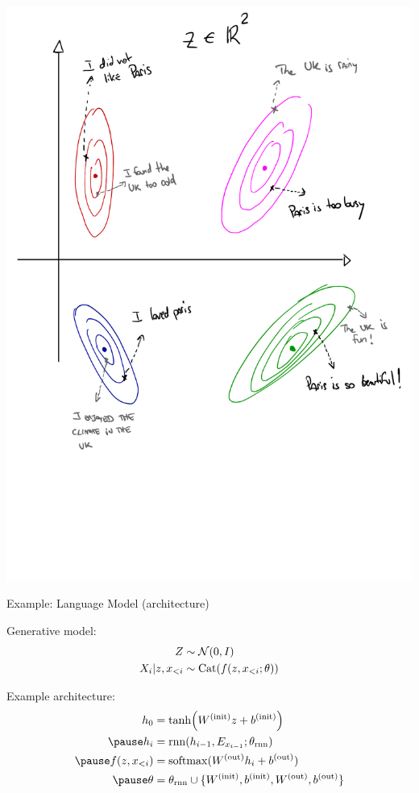 \documentclass[14pt]{beamer}
\begin{document}
\begin{frame}[plain]%

	\includegraphics[scale=0.4]{VAE-example}

\end{frame}

\begin{frame}{Example: Language Model (architecture)}

Generative model:
\begin{equation*}
\begin{aligned}
Z & \sim \mathcal N(0, I) \\
X_i|z, x_{<i} & \sim \operatorname{Cat}(f(z, x_{<i}; \theta))
\end{aligned}
\end{equation*}

\pause 
Example architecture:
\begin{equation*}
\begin{aligned}
h_0 &= \tanh(W^{(\text{init})} z + b^{(\text{init})}) \\ \pause
h_i &= \rnn(h_{i-1}, E_{x_{i-1}}; \theta_{\text{rnn}}) \\ \pause
f(z, x_{<i}) &= \softmax(W^{(\text{out})} h_i + b^{(\text{out})}) \\ \pause
\theta &= \theta_{\text{rnn}} \cup \{W^{(\text{init})}, b^{(\text{init})}, W^{(\text{out})}, b^{(\text{out})}\}
\end{aligned}
\end{equation*}


\end{frame}
\end{document}

